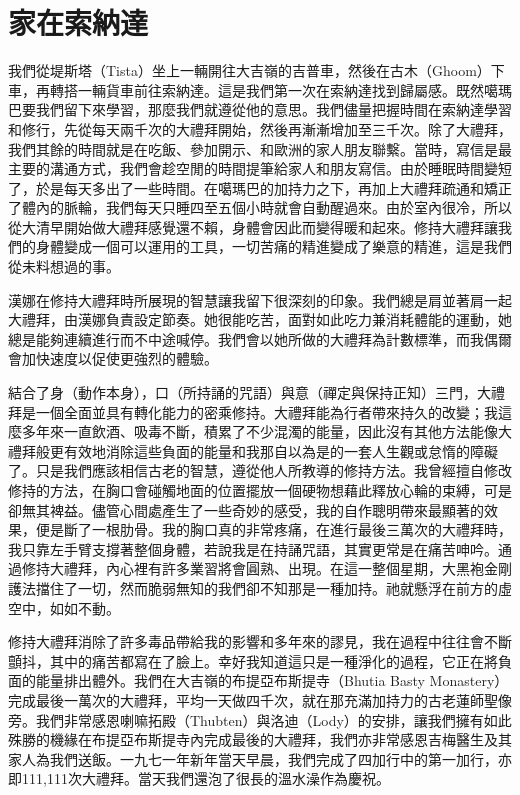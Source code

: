 \chapter{家在索納達}

我們從堤斯塔（Tista）坐上一輛開往大吉嶺的吉普車，然後在古木（Ghoom）下車，再轉搭一輛貨車前往索納達。這是我們第一次在索納達找到歸屬感。既然噶瑪巴要我們留下來學習，那麼我們就遵從他的意思。我們儘量把握時間在索納達學習和修行，先從每天兩千次的大禮拜開始，然後再漸漸增加至三千次。除了大禮拜，我們其餘的時間就是在吃飯、參加開示、和歐洲的家人朋友聯繫。當時，寫信是最主要的溝通方式，我們會趁空閒的時間提筆給家人和朋友寫信。由於睡眠時間變短了，於是每天多出了一些時間。在噶瑪巴的加持力之下，再加上大禮拜疏通和矯正了體內的脈輪，我們每天只睡四至五個小時就會自動醒過來。由於室內很冷，所以從大清早開始做大禮拜感覺還不賴，身體會因此而變得暖和起來。修持大禮拜讓我們的身體變成一個可以運用的工具，一切苦痛的精進變成了樂意的精進，這是我們從未料想過的事。

漢娜在修持大禮拜時所展現的智慧讓我留下很深刻的印象。我們總是肩並著肩一起大禮拜，由漢娜負責設定節奏。她很能吃苦，面對如此吃力兼消耗體能的運動，她總是能夠連續進行而不中途喊停。我們會以她所做的大禮拜為計數標準，而我偶爾會加快速度以促使更強烈的體驗。


結合了身（動作本身），口（所持誦的咒語）與意（禪定與保持正知）三門，大禮拜是一個全面並具有轉化能力的密乘修持。大禮拜能為行者帶來持久的改變；我這麼多年來一直飲酒、吸毒不斷，積累了不少混濁的能量，因此沒有其他方法能像大禮拜般更有效地消除這些負面的能量和我那自以為是的一套人生觀或怠惰的障礙了。只是我們應該相信古老的智慧，遵從他人所教導的修持方法。我曾經擅自修改修持的方法，在胸口會碰觸地面的位置擺放一個硬物想藉此釋放心輪的束縛，可是卻無其裨益。儘管心間處產生了一些奇妙的感受，我的自作聰明帶來最顯著的效果，便是斷了一根肋骨。我的胸口真的非常疼痛，在進行最後三萬次的大禮拜時，我只靠左手臂支撐著整個身體，若說我是在持誦咒語，其實更常是在痛苦呻吟。通過修持大禮拜，內心裡有許多業習將會圓熟、出現。在這一整個星期，大黑袍金剛護法擋住了一切，然而脆弱無知的我們卻不知那是一種加持。祂就懸浮在前方的虛空中，如如不動。


修持大禮拜消除了許多毒品帶給我的影響和多年來的謬見，我在過程中往往會不斷顫抖，其中的痛苦都寫在了臉上。幸好我知道這只是一種淨化的過程，它正在將負面的能量排出體外。我們在大吉嶺的布提亞布斯提寺（Bhutia
Basty
Monastery）完成最後一萬次的大禮拜，平均一天做四千次，就在那充滿加持力的古老蓮師聖像旁。我們非常感恩喇嘛拓殿（Thubten）與洛迪（Lody）的安排，讓我們擁有如此殊勝的機緣在布提亞布斯提寺內完成最後的大禮拜，我們亦非常感恩吉梅醫生及其家人為我們送飯。一九七一年新年當天早晨，我們完成了四加行中的第一加行，亦即111,111次大禮拜。當天我們還泡了很長的溫水澡作為慶祝。

